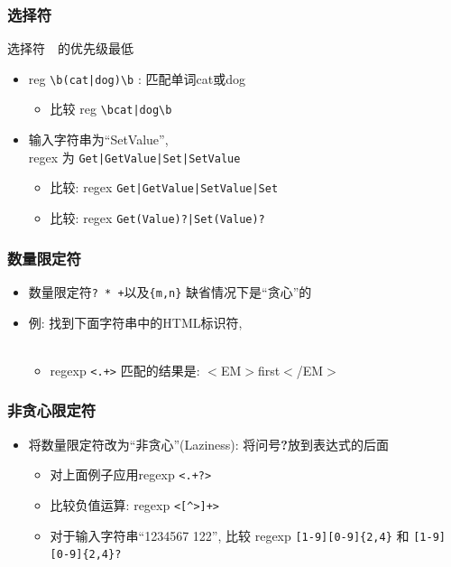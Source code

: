 \documentclass[compress]{beamer}
\begin{document}
\begin{frame}[fragile]
\frametitle{选择符}
选择符~\alert{\textbar}~的优先级最低

\begin{itemize}
\item reg {\verb=\b(cat|dog)\b=} : 匹配单词cat或dog 

\begin{itemize} \item 比较 reg {\verb=\bcat|dog\b=}
\end{itemize}

\item
输入字符串为``SetValue'', \\
regex 为 {\verb=Get|GetValue|Set|SetValue=}
    \begin{itemize}
    \item 比较: regex {\verb=Get|GetValue|SetValue|Set=}
    \item 比较: regex {\verb=Get(Value)?|Set(Value)?=}
    \end{itemize}
\end{itemize}
\end{frame}


\begin{frame}[fragile]
\frametitle{数量限定符}
\begin{itemize}
\item 数量限定符{\verb=? * +=}以及{\verb={m,n}=} 缺省情况下是``贪心''的

\item 例: 找到下面字符串中的HTML标识符, \\[2ex]
	 \\

    \begin{itemize}
    \item regexp {\verb=<.+>=} 匹配的结果是: 
$<$EM$>$first$<$/EM$>$
    \end{itemize}
\end{itemize}

\end{frame}

\begin{frame}[fragile]
  \frametitle{非贪心限定符}

  \begin{itemize}
\item 将数量限定符改为``非贪心''(Laziness):
将问号\textbf{?}放到表达式的后面
    \begin{itemize}
    \item 对上面例子应用regexp {\verb=<.+?>=}
    \item 比较负值运算: regexp {\verb=<[^>]+>=}
    \item 对于输入字符串``1234567 122'', 比较 regexp
{\verb=[1-9][0-9]{2,4}=} 和 {\verb=[1-9][0-9]{2,4}?=}
    \end{itemize}
\end{itemize}

\end{frame}
\end{document}
